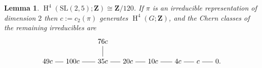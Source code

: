 \documentclass[pdftex]{sigma}
\numberwithin{equation}{section}
\newtheorem{Lemma}[Theorem]{Lemma}
\newcommand\bZ{\mathbf Z}
\DeclareMathOperator\homology{H}
\renewcommand\H{\homology}
\newcommand\<\langle
\renewcommand\>\rangle
\newcommand{\SL}{\mathrm{SL}}
\begin{document}
\begin{Lemma}\label{mckay e8}$\H^4(\SL(2,5);\bZ) \cong \bZ/120$. If $\pi$ is an irreducible representation of dimension $2$ then $c:= c_2(\pi)$ generates $\H^4(G;\bZ)$, and the Chern classes of the remaining irreducibles are
\begin{gather*}
\begin{tikzpicture}[anchor=base]
 \path
 node (1a) {$0$.}
 ++(-1,0) node (2a) {$c$}
 ++(-1,0) node (3a) {$4c$}
 ++(-1.25,0) node (4a) {$10c$}
 ++(-1.25,0) node (5a) {$20c$}
 ++(-1.25,0) node (6a) {$35c$}
 +(0,1) node (3b) {$76c$}
 ++(-1.5,0) node (4b) {$100c$}
 ++(-1.25,0) node (2b) {$49c$}
 ;
 \draw (1a.west |- 2a.east) -- (2a.east);
 \draw (2a.west) -- (3a.east |- 2a.west);
 \draw (3a.west |- 2a.west) -- (4a.east |- 2a.west);
 \draw (4a.west |- 2a.west) -- (5a.east |- 2a.west);
 \draw (5a.west |- 2a.west) -- (6a.east |- 2a.west);
 \draw (6a.west |- 2a.west) -- (4b.east |- 2a.west);
 \draw (4b.west |- 2a.west) -- (2b.east |- 2a.west);
 \draw (6a) -- (3b);
\end{tikzpicture}
\end{gather*}
\end{Lemma}
\end{document}
